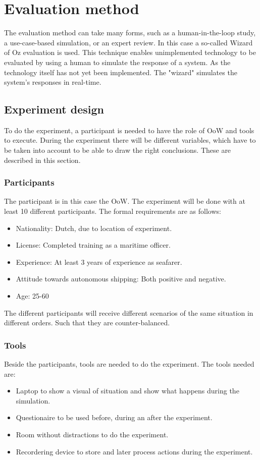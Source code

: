 
\section{Evaluation method}
The evaluation method can take many forms, such as a human-in-the-loop study, a use-case-based simulation, or an expert review. In this case a so-called Wizard of Oz evaluation is used. This technique enables unimplemented technology to be evaluated by using a human to simulate the response of a system. As the technology itself has not yet been implemented. The "wizard" simulates the system's responses in real-time.

\subsection{Experiment design}
To do the experiment, a participant is needed to have the role of \acf{OoW} and tools to execute. During the experiment there will be different variables, which have to be taken into account to be able to draw the right conclusions. These are described in this section.

\subsubsection{Participants}
The participant is in this case the \acf{OoW}. The experiment will be done with at least 10 different participants. The formal requirements are as follows:
\begin{itemize}
	\item Nationality: Dutch, due to location of experiment.
	\item License: Completed training as a maritime officer.
	\item Experience: At least 3 years of experience as seafarer.
	\item Attitude towards autonomous shipping: Both positive and negative.
	\item Age: 25-60
\end{itemize}
The different participants will receive different scenarios of the same situation in different orders. Such that they are counter-balanced.

\subsubsection{Tools}
Beside the participants, tools are needed to do the experiment. The tools needed are:
\begin{itemize}
	\item Laptop to show a visual of situation and show what happens during the simulation.
	\item Questionaire to be used before, during an after the experiment.
	\item Room without distractions to do the experiment.
	\item Recordering device to store and later process actions during the experiment.
\end{itemize}

